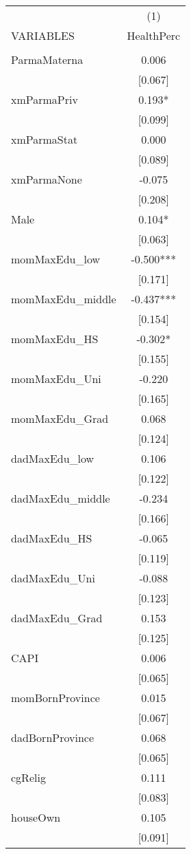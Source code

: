 \documentclass[]{article}
\begin{document}
\begin{tabular}{lc} \hline
 & (1) \\
VARIABLES & HealthPerc \\ \hline
 &  \\
ParmaMaterna & 0.006 \\
 & [0.067] \\
xmParmaPriv & 0.193* \\
 & [0.099] \\
xmParmaStat & 0.000 \\
 & [0.089] \\
xmParmaNone & -0.075 \\
 & [0.208] \\
Male & 0.104* \\
 & [0.063] \\
momMaxEdu\_low & -0.500*** \\
 & [0.171] \\
momMaxEdu\_middle & -0.437*** \\
 & [0.154] \\
momMaxEdu\_HS & -0.302* \\
 & [0.155] \\
momMaxEdu\_Uni & -0.220 \\
 & [0.165] \\
momMaxEdu\_Grad & 0.068 \\
 & [0.124] \\
dadMaxEdu\_low & 0.106 \\
 & [0.122] \\
dadMaxEdu\_middle & -0.234 \\
 & [0.166] \\
dadMaxEdu\_HS & -0.065 \\
 & [0.119] \\
dadMaxEdu\_Uni & -0.088 \\
 & [0.123] \\
dadMaxEdu\_Grad & 0.153 \\
 & [0.125] \\
CAPI & 0.006 \\
 & [0.065] \\
momBornProvince & 0.015 \\
 & [0.067] \\
dadBornProvince & 0.068 \\
 & [0.065] \\
cgRelig & 0.111 \\
 & [0.083] \\
houseOwn & 0.105 \\
 & [0.091] \\

\end{tabular}
\end{document}
